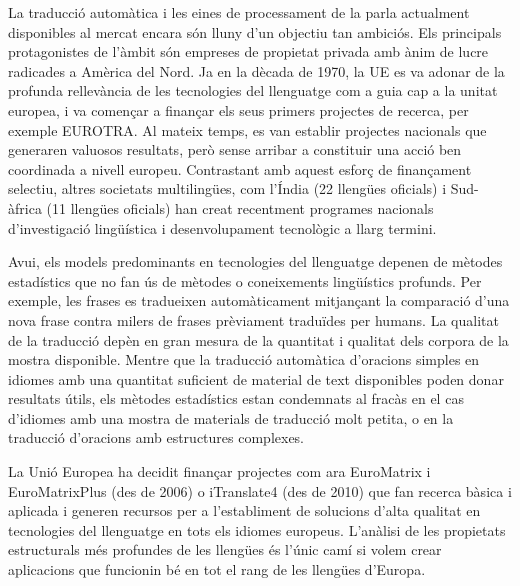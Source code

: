 \begin{multicols}{2}
La traducció automàtica i les eines de processament de la parla actualment disponibles al mercat encara són lluny d'un objectiu tan ambiciós. Els principals protagonistes de l'àmbit són empreses de propietat privada amb ànim de lucre radicades a Amèrica del Nord. Ja en la dècada de 1970, la UE es va adonar de la profunda rellevància de les tecnologies del llenguatge com a guia cap a la unitat europea, i va començar a finançar els seus primers projectes de recerca, per exemple EUROTRA. Al mateix temps, es van establir projectes nacionals que generaren valuosos resultats, però sense arribar a constituir una acció ben coordinada a nivell europeu. Contrastant amb aquest esforç de finançament selectiu, altres societats multilingües, com l'Índia (22 llengües oficials) i Sud-àfrica (11 llengües oficials) han creat recentment programes nacionals d'investigació lingüística i desenvolupament tecnològic a llarg termini.

Avui, els models predominants en tecnologies del llenguatge depenen de mètodes estadístics que no fan ús de mètodes o coneixements lingüístics profunds. Per exemple, les frases es tradueixen automàticament mitjançant la comparació d'una nova frase contra milers de frases prèviament traduïdes per humans. La qualitat de la traducció depèn en gran mesura de la quantitat i qualitat dels corpora de la mostra disponible. Mentre que la traducció automàtica d'oracions simples en idiomes amb una quantitat suficient de material de text disponibles poden donar resultats útils, els mètodes estadístics estan condemnats al fracàs en el cas d'idiomes amb una mostra de materials de traducció molt petita, o en la traducció d'oracions amb estructures complexes.


La Unió Europea ha decidit finançar projectes com ara EuroMatrix i EuroMatrixPlus (des de 2006) o iTranslate4 (des de 2010) que fan recerca bàsica i aplicada i generen recursos per a l'establiment de solucions d'alta qualitat en tecnologies del llenguatge en tots els idiomes europeus. L'anàlisi de les propietats estructurals més profundes de les llengües és l'únic camí si volem crear aplicacions que funcionin bé en tot el rang de les llengües d'Europa.


\end{multicols}
